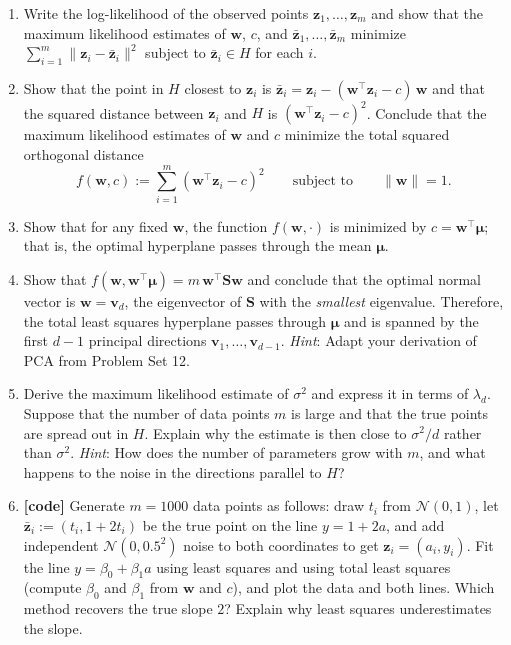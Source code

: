 \documentclass[letterpaper]{article}
\newcommand{\tr}{^\top}
\begin{document}
\begin{enumerate}
\item Write the log-likelihood of the observed points $\bm{z}_1, \dots, \bm{z}_m$ and show that the maximum likelihood estimates of $\bm{w}$, $c$, and $\bar{\bm{z}}_1, \dots, \bar{\bm{z}}_m$ minimize $\sum_{i=1}^m \|\bm{z}_i - \bar{\bm{z}}_i\|^2$ subject to $\bar{\bm{z}}_i \in H$ for each $i$.
\item Show that the point in $H$ closest to $\bm{z}_i$ is $\bar{\bm{z}}_i = \bm{z}_i - (\bm{w}\tr\bm{z}_i - c)\,\bm{w}$ and that the squared distance between $\bm{z}_i$ and $H$ is $(\bm{w}\tr\bm{z}_i - c)^2$. Conclude that the maximum likelihood estimates of $\bm{w}$ and $c$ minimize the total squared orthogonal distance
  \[
    f(\bm{w}, c) := \sum_{i=1}^m (\bm{w}\tr\bm{z}_i - c)^2 \qquad \text{subject to} \qquad \|\bm{w}\| = 1.
  \]
\item Show that for any fixed $\bm{w}$, the function $f(\bm{w}, \cdot)$ is minimized by $c = \bm{w}\tr\bm{\mu}$; that is, the optimal hyperplane passes through the mean $\bm{\mu}$.
\item Show that $f(\bm{w}, \bm{w}\tr\bm{\mu}) = m\,\bm{w}\tr\bm{S}\bm{w}$ and conclude that the optimal normal vector is $\bm{w} = \bm{v}_d$, the eigenvector of $\bm{S}$ with the \emph{smallest} eigenvalue. Therefore, the total least squares hyperplane passes through $\bm{\mu}$ and is spanned by the first $d - 1$ principal directions $\bm{v}_1, \dots, \bm{v}_{d-1}$. \emph{Hint}: Adapt your derivation of PCA from Problem Set 12.
\item Derive the maximum likelihood estimate of $\sigma^2$ and express it in terms of $\lambda_d$. Suppose that the number of data points $m$ is large and that the true points are spread out in $H$. Explain why the estimate is then close to $\sigma^2 / d$ rather than $\sigma^2$. \emph{Hint}: How does the number of parameters grow with $m$, and what happens to the noise in the directions parallel to $H$?
\item \textbf{[code]} Generate $m = 1000$ data points as follows: draw $t_i$ from $\mathcal{N}(0, 1)$, let $\bar{\bm{z}}_i := (t_i, 1 + 2 t_i)$ be the true point on the line $y = 1 + 2a$, and add independent $\mathcal{N}(0, 0.5^2)$ noise to both coordinates to get $\bm{z}_i = (a_i, y_i)$. Fit the line $y = \beta_0 + \beta_1 a$ using least squares and using total least squares (compute $\beta_0$ and $\beta_1$ from $\bm{w}$ and $c$), and plot the data and both lines. Which method recovers the true slope $2$? Explain why least squares underestimates the slope.
\end{enumerate}
\end{document}

